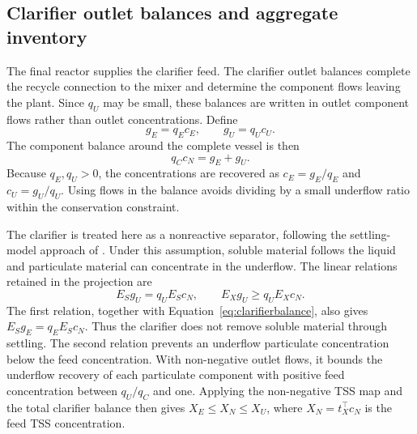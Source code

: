 \documentclass[a4paper,fleqn]{cas-sc}
\begin{document}
\subsection{Clarifier outlet balances and aggregate inventory}

The final reactor supplies the clarifier feed. The clarifier outlet balances complete the recycle connection to the mixer and determine the component flows leaving the plant. Since $q_U$ may be small, these balances are written in outlet component flows rather than outlet concentrations. Define
\begin{equation}
g_E=q_Ec_E,\qquad g_U=q_Uc_U.
\label{eq:massflows}
\end{equation}
The component balance around the complete vessel is then
\begin{equation}
q_Cc_N=g_E+g_U.
\label{eq:clarifierbalance}
\end{equation}
Because $q_E,q_U>0$, the concentrations are recovered as $c_E=g_E/q_E$ and $c_U=g_U/q_U$. Using flows in the balance avoids dividing by a small underflow ratio within the conservation constraint.

The clarifier is treated here as a nonreactive separator, following the settling-model approach of \citet{Takacs1991}. Under this assumption, soluble material follows the liquid and particulate material can concentrate in the underflow. The linear relations retained in the projection are
\begin{equation}
E_Sg_U=q_UE_Sc_N,\qquad E_Xg_U\ge q_UE_Xc_N.
\label{eq:clarificationrules}
\end{equation}
The first relation, together with Equation~\eqref{eq:clarifierbalance}, also gives $E_Sg_E=q_EE_Sc_N$. Thus the clarifier does not remove soluble material through settling. The second relation prevents an underflow particulate concentration below the feed concentration. With non-negative outlet flows, it bounds the underflow recovery of each particulate component with positive feed concentration between $q_U/q_C$ and one. Applying the non-negative TSS map and the total clarifier balance then gives $X_E\le X_N\le X_U$, where $X_N=t_X^\top c_N$ is the feed TSS concentration.
\end{document}
